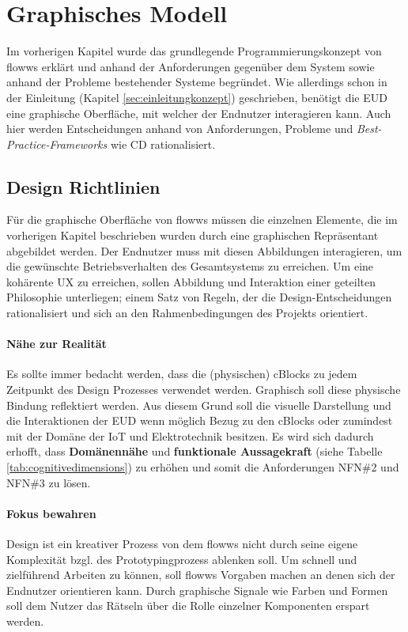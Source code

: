 \section{Graphisches Modell}\label{sec:graphischesmodell}
Im vorherigen Kapitel wurde das grundlegende Programmierungskonzept von flowws erklärt und anhand der Anforderungen gegenüber dem System sowie anhand der Probleme bestehender Systeme begründet. Wie allerdings schon in der Einleitung (Kapitel \ref{sec:einleitungkonzept}) geschrieben, benötigt die \ac{EUD} eine graphische Oberfläche, mit welcher der Endnutzer interagieren kann. Auch hier werden Entscheidungen anhand von Anforderungen, Probleme und \textit{Best-Practice-Frameworks} wie \ac{CD} rationalisiert.
 
\subsection{Design Richtlinien}
Für die graphische Oberfläche von flowws müssen die einzelnen Elemente, die im vorherigen Kapitel beschrieben wurden durch eine graphischen Repräsentant abgebildet werden. Der Endnutzer muss mit diesen Abbildungen interagieren, um die gewünschte Betriebsverhalten des Gesamtsystems zu erreichen. Um eine kohärente \ac{UX} zu erreichen, sollen Abbildung und Interaktion einer geteilten Philosophie unterliegen; einem Satz von Regeln, der die Design-Entscheidungen rationalisiert und sich an den Rahmenbedingungen des Projekts orientiert.

\paragraph{Nähe zur Realität} Es sollte immer bedacht werden, dass die (physischen) cBlocks zu jedem Zeitpunkt des Design Prozesses verwendet werden. Graphisch soll diese physische Bindung reflektiert werden. Aus diesem Grund soll die visuelle Darstellung und die Interaktionen der \ac{EUD} wenn möglich Bezug zu den cBlocks oder zumindest mit der Domäne der \ac{IoT} und Elektrotechnik besitzen. Es wird sich dadurch erhofft, dass \textbf{Domänennähe} und \textbf{funktionale Aussagekraft} (siehe Tabelle \ref{tab:cognitivedimensions}) zu erhöhen und somit die Anforderungen NFN\#2 und NFN\#3 zu lösen.

\paragraph{Fokus bewahren} Design ist ein kreativer Prozess von dem flowws nicht durch seine eigene Komplexität bzgl. des Prototypingprozess ablenken soll. Um schnell und zielführend Arbeiten zu können, soll flowws Vorgaben machen an denen sich der Endnutzer orientieren kann. Durch graphische Signale wie Farben und Formen soll dem Nutzer das Rätseln über die Rolle einzelner Komponenten erspart werden.

